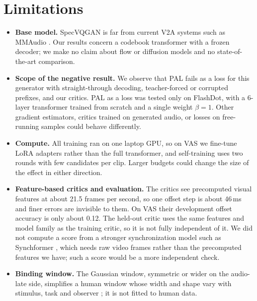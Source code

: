 \section{Limitations}
\label{sec:limitations}

\begin{itemize}
  \item \textbf{Base model.} SpecVQGAN is far from current V2A systems such as MMAudio \citep{cheng2025mmaudio}. Our results concern a codebook transformer with a frozen decoder; we make no claim about flow or diffusion models and no state-of-the-art comparison.
  \item \textbf{Scope of the negative result.} We observe that PAL fails as a loss for this generator with straight-through decoding, teacher-forced or corrupted prefixes, and our critics. PAL as a loss was tested only on FlashDot, with a 6-layer transformer trained from scratch and a single weight $\beta = 1$. Other gradient estimators, critics trained on generated audio, or losses on free-running samples could behave differently.
  \item \textbf{Compute.} All training ran on one laptop GPU, so on VAS we fine-tune LoRA adapters rather than the full transformer, and self-training uses two rounds with few candidates per clip. Larger budgets could change the size of the effect in either direction.
  \item \textbf{Feature-based critics and evaluation.} The critics see precomputed visual features at about 21.5 frames per second, so one offset step is about 46\,ms and finer errors are invisible to them. On VAS their development offset accuracy is only about 0.12. The held-out critic uses the same features and model family as the training critic, so it is not fully independent of it. We did not compute a score from a stronger synchronization model such as Synchformer \citep{iashin2024synchformer}, which needs raw video frames rather than the precomputed features we have; such a score would be a more independent check.
  \item \textbf{Binding window.} The Gaussian window, symmetric or wider on the audio-late side, simplifies a human window whose width and shape vary with stimulus, task and observer \citep{stevenson2012individual,takeshima2021visual}; it is not fitted to human data.
\end{itemize}
